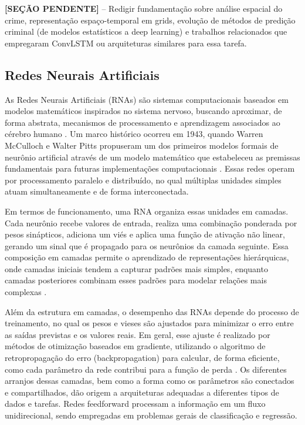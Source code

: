 \textbf{[SEÇÃO PENDENTE]} -- Redigir fundamentação sobre análise espacial do crime, representação espaço-temporal em grids, evolução de métodos de predição criminal (de modelos estatísticos a deep learning) e trabalhos relacionados que empregaram ConvLSTM ou arquiteturas similares para essa tarefa.


\subsection{Redes Neurais Artificiais}

As Redes Neurais Artificiais (RNAs) são sistemas computacionais baseados em modelos matemáticos inspirados no sistema nervoso, buscando aproximar, de forma abstrata, mecanismos de processamento e aprendizagem associados ao cérebro humano \cite{sala2019}. Um marco histórico ocorreu em 1943, quando Warren McCulloch e Walter Pitts propuseram um dos primeiros modelos formais de neurônio artificial através de um modelo matemático que estabeleceu as premissas fundamentais para futuras implementações computacionais \cite{mc1943}. Essas redes operam por processamento paralelo e distribuído, no qual múltiplas unidades simples atuam simultaneamente e de forma interconectada.

Em termos de funcionamento, uma RNA organiza essas unidades em camadas. Cada neurônio recebe valores de entrada, realiza uma combinação ponderada por pesos sinápticos, adiciona um viés e aplica uma função de ativação não linear, gerando um sinal que é propagado para os neurônios da camada seguinte. Essa composição em camadas permite o aprendizado de representações hierárquicas, onde camadas iniciais tendem a capturar padrões mais simples, enquanto camadas posteriores combinam esses padrões para modelar relações mais complexas \cite{gupta2018}.

Além da estrutura em camadas, o desempenho das RNAs depende do processo de treinamento, no qual os pesos e vieses são ajustados para minimizar o erro entre as saídas previstas e os valores reais. Em geral, esse ajuste é realizado por métodos de otimização baseados em gradiente, utilizando o algoritmo de retropropagação do erro (backpropagation) para calcular, de forma eficiente, como cada parâmetro da rede contribui para a função de perda \cite{rumelhart1986learning}. Os diferentes arranjos dessas camadas, bem como a forma como os parâmetros são conectados e compartilhados, dão origem a arquiteturas adequadas a diferentes tipos de dados e tarefas. Redes feedforward processam a informação em um fluxo unidirecional, sendo empregadas em problemas gerais de classificação e regressão. 

